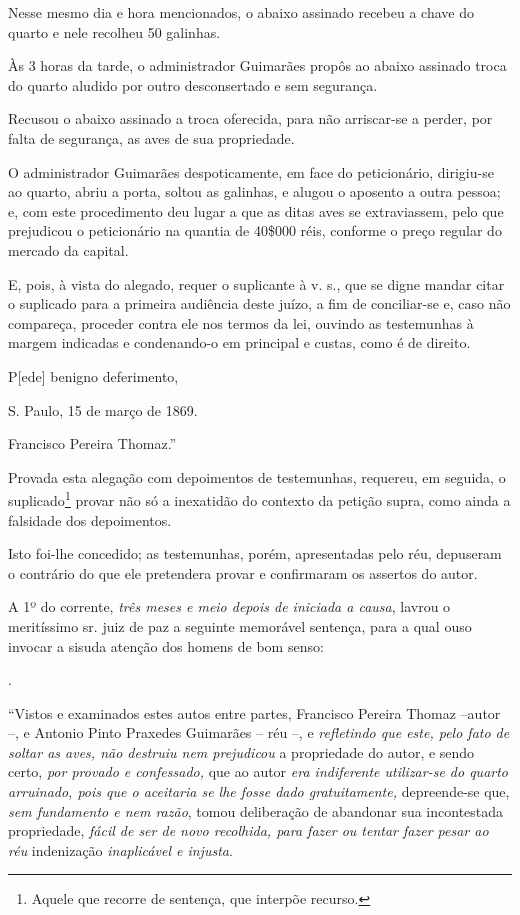 Nesse mesmo dia e hora mencionados, o abaixo assinado recebeu a chave do
quarto e nele recolheu 50 galinhas.

Às 3 horas da tarde, o administrador Guimarães propôs ao abaixo assinado
troca do quarto aludido por outro desconsertado e sem segurança.

Recusou o abaixo assinado a troca oferecida, para não arriscar-se a
perder, por falta de segurança, as aves de sua propriedade.

O administrador Guimarães despoticamente, em face do peticionário,
dirigiu-se ao quarto, abriu a porta, soltou as galinhas, e alugou o
aposento a outra pessoa; e, com este procedimento deu lugar a que as
ditas aves se extraviassem, pelo que prejudicou o peticionário na
quantia de 40\$000 réis, conforme o preço regular do mercado da capital.

E, pois, à vista do alegado, requer o suplicante à v. s., que se digne
mandar citar o suplicado para a primeira audiência deste juízo, a fim de
conciliar-se e, caso não compareça, proceder contra ele nos termos da
lei, ouvindo as testemunhas à margem indicadas e condenando-o em
principal e custas, como é de direito.

P{[}ede{]} benigno deferimento,

S. Paulo, 15 de março de 1869.

Francisco Pereira Thomaz.''

Provada esta alegação com depoimentos de testemunhas, requereu, em
seguida, o suplicado\footnote{Aquele que recorre de sentença, que
  interpõe recurso.} provar não só a inexatidão do contexto da petição
supra, como ainda a falsidade dos depoimentos.

Isto foi-lhe concedido; as testemunhas, porém, apresentadas pelo réu,
depuseram o contrário do que ele pretendera provar e confirmaram os
assertos do autor.

A 1º do corrente, \emph{três meses e meio depois de iniciada a causa},
lavrou o meritíssimo sr. juiz de paz a seguinte memorável sentença, para
a qual ouso invocar a sisuda atenção dos homens de bom senso:

.

``Vistos e examinados estes autos entre partes, Francisco Pereira Thomaz
--autor --, e Antonio Pinto Praxedes Guimarães -- réu --, e
\emph{refletindo que este, pelo fato de soltar as aves, não destruiu nem
prejudicou} a propriedade do autor, e sendo certo, \emph{por provado e
confessado,} que ao autor \emph{era indiferente utilizar-se do quarto
arruinado, pois que o aceitaria se lhe fosse dado gratuitamente,}
depreende-se que, \emph{sem fundamento e nem razão}, tomou deliberação
de abandonar sua incontestada propriedade, \emph{fácil de ser de novo
recolhida, para fazer ou tentar fazer pesar ao réu} indenização
\emph{inaplicável e injusta}.

